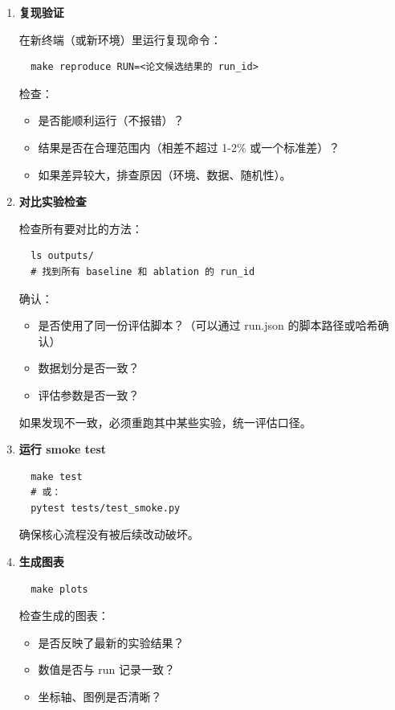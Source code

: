 \begin{enumerate}
  \item \textbf{复现验证}

  在新终端（或新环境）里运行复现命令：
  \begin{verbatim}
  make reproduce RUN=<论文候选结果的 run_id>
  \end{verbatim}

  检查：
  \begin{itemize}
    \item 是否能顺利运行（不报错）？
    \item 结果是否在合理范围内（相差不超过 1-2\% 或一个标准差）？
    \item 如果差异较大，排查原因（环境、数据、随机性）。
  \end{itemize}

  \item \textbf{对比实验检查}

  检查所有要对比的方法：
  \begin{verbatim}
  ls outputs/
  # 找到所有 baseline 和 ablation 的 run_id
  \end{verbatim}

  确认：
  \begin{itemize}
    \item 是否使用了同一份评估脚本？（可以通过 run.json 的脚本路径或哈希确认）
    \item 数据划分是否一致？
    \item 评估参数是否一致？
  \end{itemize}

  如果发现不一致，必须重跑其中某些实验，统一评估口径。

  \item \textbf{运行 smoke test}
  \begin{verbatim}
  make test
  # 或：
  pytest tests/test_smoke.py
  \end{verbatim}

  确保核心流程没有被后续改动破坏。

  \item \textbf{生成图表}
  \begin{verbatim}
  make plots
  \end{verbatim}

  检查生成的图表：
  \begin{itemize}
    \item 是否反映了最新的实验结果？
    \item 数值是否与 run 记录一致？
    \item 坐标轴、图例是否清晰？
  \end{itemize}
\end{enumerate}

